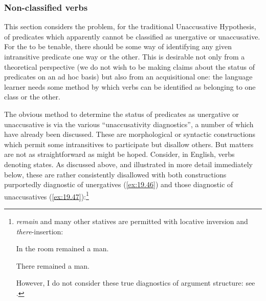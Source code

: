 \documentclass[output=paper]{langsci/langscibook}
\begin{document}
\subsubsection{Non-classified verbs}

This section considers the problem, for the traditional Unaccusative
Hypothesis, of predicates which apparently cannot be classified as unergative
or unaccusative. For the  to be tenable, there should be
some way of identifying any given intransitive predicate one way or the other.
This is desirable not only from a theoretical perspective (we do not wish to be
making claims about the status of predicates on an ad hoc basis) but also from
an acquisitional one: the language learner needs some method by which verbs can
be identified as belonging to one class or the other.

The obvious method to determine the status of predicates as unergative or
unaccusative is via the various \enquote{unaccusativity diagnostics}, a number
of which have already been discussed. These are morphological or syntactic
constructions which permit some intransitives to participate but disallow
others. But matters are not as straightforward as might be hoped. Consider, in
English, verbs denoting states. As discussed above, and illustrated in more
detail immediately below, these are rather consistently disallowed with both
constructions purportedly diagnostic of unergatives (\ref{ex:19.46}) and those
diagnostic of unaccusatives (\ref{ex:19.47}):\footnote{\emph{remain} and many other
    statives are permitted with locative inversion and
    \emph{there}{}-insertion:

\begin{exe} In the room remained a man.\end{exe}
\begin{exe}There remained a man.\end{exe}
However, I do not consider these true diagnostics of argument structure: see
\textcites[Ch.\ 6]{LevinRappaportHovav1995,Baker2018,Baker2019}.}

\ea\label{ex:19.46}
    \z
\z

\ea\label{ex:19.47}
\end{document}
